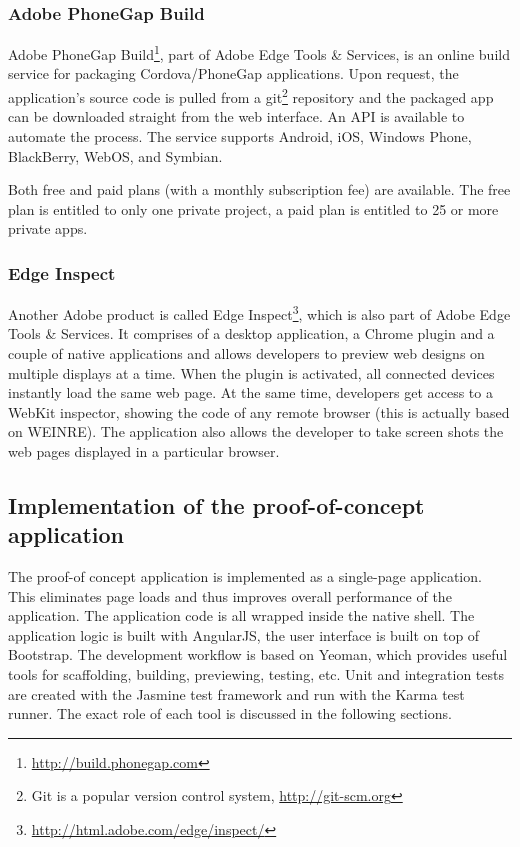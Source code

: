 \subsubsection{Adobe PhoneGap Build}

Adobe PhoneGap Build\footnote{\url{http://build.phonegap.com}}, part of Adobe Edge Tools \& Services, is an online build service for packaging Cordova/PhoneGap applications. Upon request, the application's source code is pulled from a git\footnote{Git is a popular version control system, \url{http://git-scm.org}} repository and the packaged app can be downloaded straight from the web interface. An API is available to automate the process. The service supports Android, iOS, Windows Phone, BlackBerry, WebOS, and Symbian.

Both free and paid plans (with a monthly subscription fee) are available. The free plan is entitled to only one private project, a paid plan is entitled to 25 or more private apps.

\subsubsection{Edge Inspect}

Another Adobe product is called Edge Inspect\footnote{\url{http://html.adobe.com/edge/inspect/}}, which is also part of Adobe Edge Tools \& Services. It comprises of a desktop application, a Chrome plugin and a couple of native applications and allows developers to preview web designs on multiple displays at a time. When the plugin is activated, all connected devices instantly load the same web page. At the same time, developers get access to a WebKit inspector, showing the code of any remote browser (this is actually based on WEINRE). The application also allows the developer to take screen shots the web pages displayed in a particular browser.

\subsection{Implementation of the proof-of-concept application}

The proof-of concept application is implemented as a single-page application. This eliminates page loads and thus improves overall performance of the application. The application code is all wrapped inside the native shell.  The application logic is built with AngularJS, the user interface is built on top of Bootstrap. The development workflow is based on Yeoman, which provides useful tools for scaffolding, building, previewing, testing, etc. Unit and integration tests are created with the Jasmine test framework and run with the Karma test runner. The exact role of each tool is discussed in the following sections.

